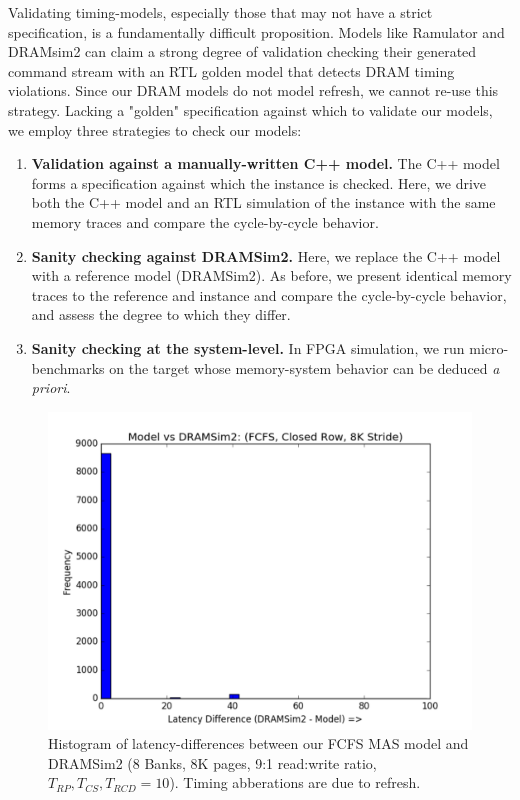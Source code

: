Validating timing-models, especially those that may not have a strict
specification, is a fundamentally difficult proposition. Models like Ramulator
and DRAMsim2 can claim a strong degree of validation checking their generated
command stream with an RTL golden model that detects DRAM timing violations.
Since our DRAM models do not model refresh, we cannot re-use this strategy.
Lacking a "golden" specification against which to validate our models, we
employ three strategies to check our models:

\begin{enumerate}
    \item \textbf{Validation against a manually-written C++ model.} The C++ model forms a
        specification against which the instance is checked. Here, we drive both the
        C++ model and an RTL simulation of the instance with the same memory
        traces and compare the cycle-by-cycle behavior.

    \item \textbf{Sanity checking against DRAMSim2.} Here, we replace the C++
        model with a reference model (DRAMSim2). As before, we present
        identical memory traces to the reference and instance and compare
        the cycle-by-cycle behavior, and assess the degree to which they differ.

    \item \textbf{Sanity checking at the system-level.} In FPGA simulation, we run
        micro-benchmarks on the target whose memory-system behavior can be
        deduced \textit{a priori}.
\end{enumerate}

\begin{figure}[t]
	\centering
	\includegraphics[width=0.75\columnwidth]{figures/close_row_stride.pdf}
    \caption{Histogram of latency-differences between our FCFS MAS model and DRAMSim2 (8 Banks, 8K pages, 9:1 read:write ratio,  $T_{RP},T_{CS},T_{RCD} =
    10$). Timing abberations are due to refresh.}
  \label{fig:error_histogram}
\end{figure}

